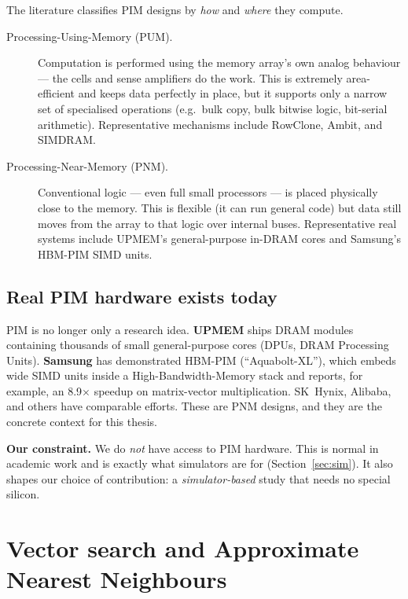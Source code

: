 \documentclass[11pt,a4paper]{article}
\newcommand{\term}[1]{\textbf{\color{slate}#1}}
\begin{document}
The literature classifies PIM designs by \emph{how} and \emph{where} they compute.

\begin{description}
\item[\color{teal}Processing-Using-Memory (PUM).] Computation is performed using the memory array's
own analog behaviour --- the cells and sense amplifiers do the work. This is extremely area-efficient
and keeps data perfectly in place, but it supports only a narrow set of specialised operations
(e.g.\ bulk copy, bulk bitwise logic, bit-serial arithmetic). Representative mechanisms include
RowClone, Ambit, and SIMDRAM.
\item[\color{teal}Processing-Near-Memory (PNM).] Conventional logic --- even full small processors ---
is placed physically close to the memory. This is flexible (it can run general code) but data still
moves from the array to that logic over internal buses. Representative real systems include UPMEM's
general-purpose in-DRAM cores and Samsung's HBM-PIM SIMD units.
\end{description}

\subsection{Real PIM hardware exists today}

PIM is no longer only a research idea. \term{UPMEM} ships DRAM modules containing thousands of small
general-purpose cores (DPUs, DRAM Processing Units). \term{Samsung} has demonstrated HBM-PIM
(``Aquabolt-XL''), which embeds wide SIMD units inside a High-Bandwidth-Memory stack and reports,
for example, an 8.9$\times$ speedup on matrix-vector multiplication. SK~Hynix, Alibaba, and others
have comparable efforts. These are PNM designs, and they are the concrete context for this thesis.

\begin{keybox}
\textbf{Our constraint.} We do \emph{not} have access to PIM hardware. This is normal in academic
work and is exactly what simulators are for (Section~\ref{sec:sim}). It also shapes our choice of
contribution: a \emph{simulator-based} study that needs no special silicon.
\end{keybox}

\section{Vector search and Approximate Nearest Neighbours}
\end{document}
